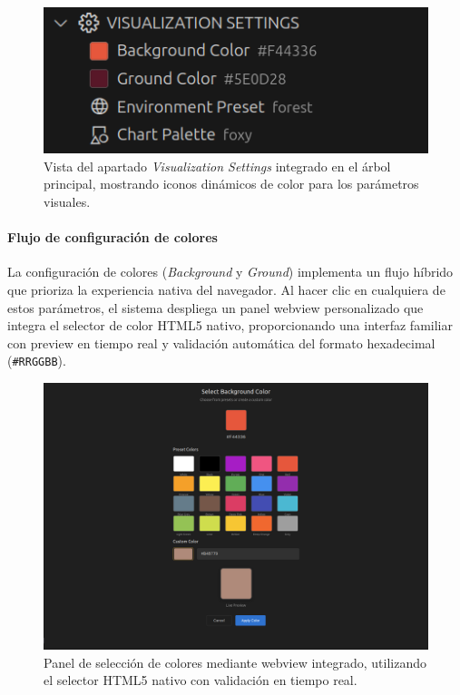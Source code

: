 \documentclass[a4paper, 12pt]{book}
\begin{document}
\begin{figure}[H]
\centering
\includegraphics[width=0.60\linewidth]{img/ui-visualization-settings-tree.png}
\caption{Vista del apartado \emph{Visualization Settings} integrado en el árbol principal, mostrando iconos dinámicos de color para los parámetros visuales.}
\label{fig:ui-visualization-settings-tree}
\end{figure}

\paragraph{Flujo de configuración de colores}
La configuración de colores (\emph{Background} y \emph{Ground}) implementa un flujo híbrido que prioriza la experiencia nativa del navegador. Al hacer clic en cualquiera de estos parámetros, el sistema despliega un panel webview personalizado que integra el selector de color HTML5 nativo, proporcionando una interfaz familiar con preview en tiempo real y validación automática del formato hexadecimal (\texttt{\#RRGGBB}).

\begin{figure}[H]
\centering
\includegraphics[width=1\linewidth]{img/ui-color-picker-panel.png}
\caption{Panel de selección de colores mediante webview integrado, utilizando el selector HTML5 nativo con validación en tiempo real.}
\label{fig:ui-color-picker-panel}
\end{figure}
\end{document}

